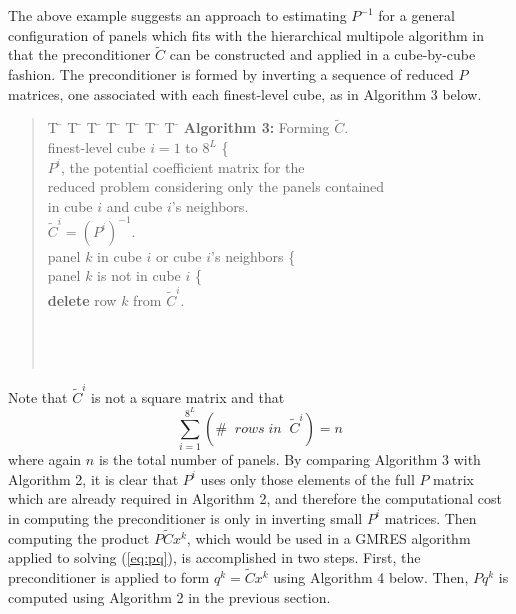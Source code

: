 The above example suggests an approach to estimating $ P^{-1} $ for a
general configuration of panels which fits with the
hierarchical multipole algorithm in that the preconditioner $ \tilde{C} $ can
be constructed and applied in a cube-by-cube fashion.  The preconditioner
is formed by inverting a sequence of reduced $ P $ matrices, one associated
with each finest-level cube, as in Algorithm 3 below.

\begin{singlespace}
\begin{quote}
\begin{tabbing}
T \= \kill
\>T \= \kill
\>\>T \= \kill
\>\>\>T \= \kill
\>\>\>\>T \= \kill
\>\>\>\>\>T \= \kill
\>\>\>\>\>\>T \= \kill
{\bf Algorithm 3:} Forming $ \tilde{C} $.\\
\> finest-level cube $ i = 1 $ to $ 8^L $ \{ \\
\>\> $P^{i} $, the potential coefficient matrix for the\\
\>\>\>reduced problem considering only the panels contained\\
\>\>\>in cube $i $ and cube $i $'s neighbors.\\
\>\> $ \tilde{C}^i = (P^i)^{-1} $.\\
\>\> panel $ k $ in cube $i $ or cube $i $'s neighbors \{\\
\>\>\> panel $ k $ is not in cube $ i $ \{\\
\>\>\>\>\> {\bf delete} row $ k $ from $ \tilde{C}^i $.\\
\>\>\>\>{\bf \}}\\
\>\>\>{\bf \}}\\
\>\>{\bf \}}\\
\end{tabbing}
\end{quote}
\end{singlespace}

Note that $ \tilde{C}^i $ is not a square matrix and that
\begin{equation}
\sum_{i=1}^{8^L} (\# \; \; rows \; in \; \; \tilde{C}^{i}) = n 
\end{equation}
where again $ n $ is the total number of panels.
By comparing Algorithm 3 with Algorithm 2, it is clear that
$ P^{i} $ uses only those elements of the full $ P $ matrix which are
already required in Algorithm 2, and therefore the computational cost
in computing the preconditioner is only in inverting small $ P^{i} $ 
matrices.  Then computing the product $ P \tilde{C} x^k $, 
which would be used in a GMRES algorithm applied to
solving (\ref{eq:pq}), is accomplished in two steps. First, the
preconditioner is applied to form $ q^k = \tilde{C} x^k $ using
Algorithm 4 below.  Then, $ P q^k $ is computed using Algorithm 2 in
the previous section.

